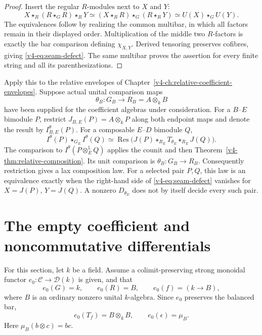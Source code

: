 \begin{proof}
Insert the regular \(R\)-modules next to \(X\) and \(Y\):
\[
 X\star_R(R\star_G R)\star_R Y
 \simeq
 (X\star_R R)\star_G(R\star_R Y)
 \simeq U(X)\star_G U(Y).
\]
The equivalences follow by realizing the common multibar, in which
all factors remain in their displayed order. Multiplication of the
middle two \(R\)-factors is exactly the bar comparison defining
\(\chi_{X,Y}\). Derived tensoring preserves cofibres, giving
\eqref{v4-eq:seam-defect}. The same multibar proves the assertion for
every finite string and all its parenthesizations.
\end{proof}

Apply this to the relative envelopes of
Chapter~\ref{v4-ch:relative-coefficient-envelopes}.
Suppose actual unital comparison maps
\[
 \theta_B:G_B\longrightarrow R_B=A\otimes_k B
\]
have been supplied for the coefficient algebras under consideration.
For a \(B\)--\(E\) bimodule \(P\), restrict
\(J_{B,E}(P)=A\otimes_k P\) along both endpoint maps and denote the
result by \(I^\theta_{B,E}(P)\).
For a composable \(E\)--\(D\) bimodule \(Q\),
\begin{equation}\label{v4-eq:coefficient-seam}
 I^\theta(P)\star_{G_E}I^\theta(Q)
 \simeq
 \operatorname{Res}\bigl(
 J(P)\star_{R_E}T_{\theta_E}\star_{R_E}J(Q)\bigr).
\end{equation}
The comparison to \(I^\theta(P\otimes_E^{\mathbb L}Q)\) applies the
counit and then Theorem~\ref{v4-thm:relative-composition}.
Its unit comparison is \(\theta_B:G_B\to R_B\).
Consequently restriction gives a lax composition law. For a selected
pair \(P,Q\), this law is an equivalence exactly when the right-hand
side of \eqref{v4-eq:seam-defect} vanishes for \(X=J(P)\), \(Y=J(Q)\).
A nonzero \(D_{\theta_E}\) does not by itself decide every such pair.

\section{The empty coefficient and noncommutative differentials}
\label{v4-sec:empty-seam}

For this section, let \(k\) be a field. Assume a colimit-preserving
strong monoidal functor \(e_0:\mathcal C\to\mathcal D(k)\) is given, and that
\[
 e_0(G)=k,\qquad e_0(R)=B,\qquad e_0(f)=(k\longrightarrow B),
\]
where \(B\) is an ordinary nonzero unital \(k\)-algebra.
Since \(e_0\) preserves the balanced bar,
\[
 e_0(T_f)=B\otimes_k B,\qquad e_0(\epsilon)=\mu_B.
\]
Here \(\mu_B(b\otimes c)=bc\).

